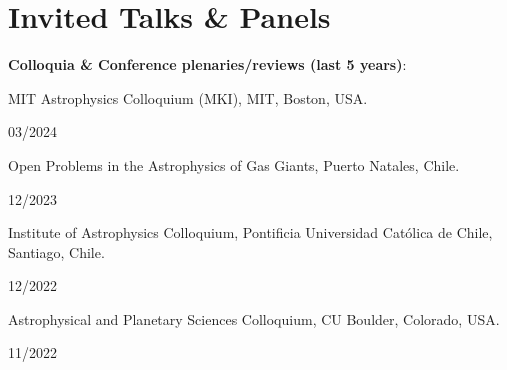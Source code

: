 \documentclass[12pt, a4paper]{article} %
\begin{document}
\section*{Invited Talks \& Panels}

\textbf{Colloquia \& Conference plenaries/reviews (last 5 years)}:\\

\begin{minipage}[t]{0.7\textwidth}
\begin{flushleft}%
  \setlength{\leftskip}{0.2cm}%
MIT Astrophysics Colloquium (MKI), MIT, Boston, USA.
\end{flushleft}
\end{minipage}
\begin{minipage}[t]{0.3\textwidth}
\hfill 03/2024
\end{minipage}
\vspace{0.2cm}

\begin{minipage}[t]{0.7\textwidth}
\begin{flushleft}%
  \setlength{\leftskip}{0.2cm}%
Open Problems in the Astrophysics of Gas Giants, Puerto Natales, Chile.
\end{flushleft}
\end{minipage}
\begin{minipage}[t]{0.3\textwidth}
\hfill 12/2023
\end{minipage}
\vspace{0.2cm}

\begin{minipage}[t]{0.7\textwidth}
\begin{flushleft}%
  \setlength{\leftskip}{0.2cm}%
Institute of Astrophysics Colloquium, Pontificia Universidad Cat\'olica de Chile, Santiago, Chile.
\end{flushleft}
\end{minipage}
\begin{minipage}[t]{0.3\textwidth}
\hfill 12/2022
\end{minipage}
\vspace{0.2cm}

\begin{minipage}[t]{0.7\textwidth}
\begin{flushleft}%
  \setlength{\leftskip}{0.2cm}%
Astrophysical and Planetary Sciences Colloquium, CU Boulder, Colorado, USA.
\end{flushleft}
\end{minipage}
\begin{minipage}[t]{0.3\textwidth}
\hfill 11/2022
\end{minipage}
\vspace{0.2cm}
\end{document}
